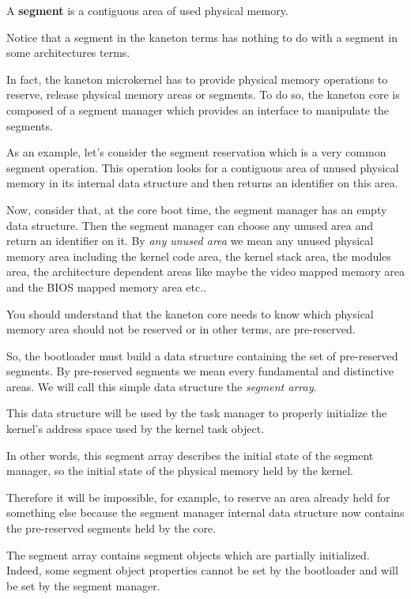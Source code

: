 A \textbf{segment} is a contiguous area of used physical memory.

Notice that a segment in the kaneton terms has nothing to do with
a segment in some architectures terms.

In fact, the kaneton microkernel has to provide physical memory operations to
reserve, release physical memory areas or segments. To do so, the kaneton
core is composed of a segment manager which provides an interface to
manipulate the segments.

As an example, let's consider the segment reservation which is a very
common segment operation. This operation looks for a contiguous area
of unused physical memory in its internal data structure and then
returns an identifier on this area.

Now, consider that, at the core boot time, the segment manager has
an empty data structure. Then the segment manager can choose any
unused area and return an identifier on it. By \textit{any unused area} we
mean any unused physical memory area including the kernel code area, the kernel
stack area, the modules area, the architecture dependent areas like maybe the
video mapped memory area and the BIOS mapped memory area etc..

You should understand that the kaneton core needs to know which physical
memory area should not be reserved or in other terms, are pre-reserved.

So, the bootloader must build a data structure containing the set of
pre-reserved segments. By pre-reserved segments we mean every fundamental
and distinctive areas. We will call this simple data structure the
\textit{segment array}.

This data structure will be used by the task manager to properly
initialize the kernel's address space used by the kernel task object.

In other words, this segment array describes the initial state of the
segment manager, so the initial state of the physical memory held by the
kernel.

Therefore it will be impossible, for example, to reserve an area
already held for something else because the segment manager internal
data structure now contains the pre-reserved segments held by the
core.

The segment array contains segment objects which are partially
initialized. Indeed, some segment object properties cannot be set
by the bootloader and will be set by the segment manager.


